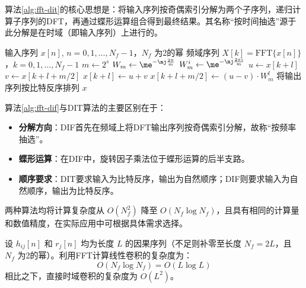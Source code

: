 算法\ref{alg:fft-dit}的核心思想是：将输入序列按奇偶索引分解为两个子序列，递归计算子序列的DFT，再通过蝶形运算组合得到最终结果。其名称“按时间抽选”源于此分解是在时域（即输入序列）上进行的。

\begin{algorithm}[H]
    \caption{基2 FFT算法（按频率抽选, DIF）}
    \label{alg:fft-dif}
    \begin{algorithmic}[1]
        \Require 输入序列 $x[n]$, $n=0,1,\dots,N_f-1$，$N_f$ 为2的幂
        \Ensure 频域序列 $X[k] = \mathrm{FFT}\{x[n]\}$，$k=0,1,\dots,N_f-1$
         
        \State $m \gets 2^s$ 
        \State $W_m \gets \me^{-\mj\frac{2\pi}{m}}$ 
        \State $W_m^i \gets \me^{-\mj\frac{2\pi i}{m}}$ 
        \EndFor
         
         
        \State $u \gets x[k + l]$
        \State $v \gets x[k + l + m/2]$
        \State $x[k + l] \gets u + v$
        \State $x[k + l + m/2] \gets (u - v) \cdot W_m^l$
        \EndFor
        \EndFor
        \EndFor
        \State 将输出序列按比特反序排列
        \State \Return $x$ 
    \end{algorithmic}
\end{algorithm}

算法\ref{alg:fft-dif}与DIT算法的主要区别在于：
\begin{itemize}
    \item \textbf{分解方向}：DIF首先在频域上将DFT输出序列按奇偶索引分解，故称“按频率抽选”。
    \item \textbf{蝶形运算}：在DIF中，旋转因子乘法位于蝶形运算的后半支路。
    \item \textbf{顺序要求}：DIT要求输入为比特反序，输出为自然顺序；DIF则要求输入为自然顺序，输出为比特反序。
\end{itemize}

两种算法均将计算复杂度从 $O(N_f^2)$ 降至 $O(N_f \log N_f)$，且具有相同的计算量和数值精度，在实际应用中可根据具体需求选择。

\begin{theorem}[FFT加速的线性卷积计算复杂度]
    \label{thm:fft-element}
    设 $h_{ij}[n]$ 和 $r_j[n]$ 均为长度 $L$ 的因果序列（不足则补零至长度 $N_f=2L$，且 $N_f$ 为2的幂）。利用FFT计算线性卷积的复杂度为：
    \begin{equation}
        O(N_f \log N_f) = O(L \log L)
    \end{equation}
    相比之下，直接时域卷积的复杂度为 $O(L^2)$。
\end{theorem}

